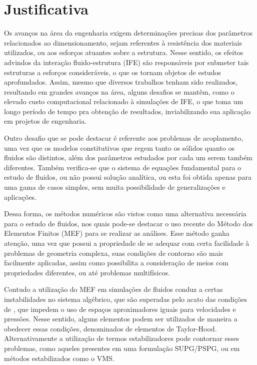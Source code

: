\section{Justificativa}

Os avanços na área da engenharia exigem determinações precisas dos parâmetros relacionados ao dimensionamento, sejam referentes à resistência dos materiais utilizados, ou aos esforços atuantes sobre a estrutura. Nesse sentido, os efeitos advindos da interação fluido-estrutura (IFE) são responsáveis por submeter tais estruturas a esforços consideráveis, o que os tornam objetos de estudos aprofundados. Assim, mesmo que diversos trabalhos tenham sido realizados, resultando em grandes avanços na área, alguns desafios se mantêm, como o elevado custo computacional relacionado à simulações de IFE, o que toma um longo período de tempo pra obtenção de resultados, inviabilizando sua aplicação em projetos de engenharia.

Outro desafio que se pode destacar é referente aos problemas de acoplamento, uma vez que os modelos constitutivos que regem tanto os sólidos quanto os fluidos são distintos, além dos parâmetros estudados por cada um serem também diferentes. Também verifica-se que o sistema de equações fundamental para o estudo de fluidos, ou não possui solução analítica, ou esta foi obtida apenas para uma gama de casos simples, sem muita possibilidade de generalizações e aplicações.

Dessa forma, os métodos numéricos são vistos como uma alternativa necessária para o estudo de fluidos, nos quais pode-se destacar o uso recente do Método dos Elementos Finitos (MEF) para se realizar as análises. Esse método ganha atenção, uma vez que possui a propriedade de se adequar com certa facilidade à problemas de geometria complexa, suas condições de contorno são mais facilmente aplicadas, assim como possibilita a consideração de meios com propriedades diferentes, ou até problemas multifísicos.

Contudo a utilização do MEF em simulações de fluidos conduz a certas instabilidades no sistema algébrico, que são superadas pelo acato das condições de \LBB, que impedem o uso de espaços aproximadores iguais para velocidades e pressões. Nesse sentido, alguns elementos podem ser utilizados de maneira a obedecer essas condições, denominados de elementos de Taylor-Hood. Alternativamente a utilização de termos estabilizadores pode contornar esses problemas, como aqueles presentes em uma formulação SUPG/PSPG, ou em métodos estabilizados como o VMS.

